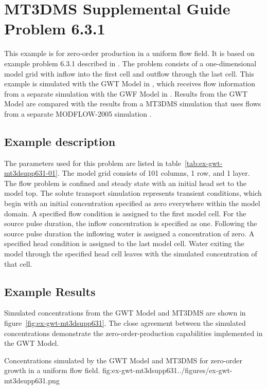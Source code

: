\section{MT3DMS Supplemental Guide Problem 6.3.1}

This example is for zero-order production in a uniform flow field.  It is based on example problem 6.3.1 described in \cite{zheng2010mt3dmsv5.3}.  The problem consists of a one-dimensional model grid with inflow into the first cell and outflow through the last cell.  This example is simulated with the GWT Model in \mf, which receives flow information from a separate simulation with the GWF Model in \mf.  Results from the GWT Model are compared with the results from a MT3DMS simulation \citep{zheng1990mt3d} that uses flows from a separate MODFLOW-2005 simulation \citep{modflow2005}.  

\subsection{Example description}

The parameters used for this problem are listed in table~\ref{tab:ex-gwt-mt3dsupp631-01}.  The model grid consists of 101 columns, 1 row, and 1 layer.  The flow problem is confined and steady state with an initial head set to the model top.  The solute transport simulation represents transient conditions, which begin with an initial concentration specified as zero everywhere within the model domain.  A specified flow condition is assigned to the first model cell.  For the source pulse duration, the inflow concentration is specified as one.  Following the source pulse duration the inflowing water is assigned a concentration of zero.  A specified head condition is assigned to the last model cell.  Water exiting the model through the specified head cell leaves with the simulated concentration of that cell.



\subsection{Example Results}

Simulated concentrations from the \mf GWT Model and MT3DMS are shown in figure~\ref{fig:ex-gwt-mt3dsupp631}.  The close agreement between the simulated concentrations demonstrate the zero-order-production capabilities implemented in the GWT Model.

\begin{StandardFigure}{
                                     Concentrations simulated by the \mf GWT Model and MT3DMS for zero-order growth in a uniform flow field.
                                     }{fig:ex-gwt-mt3dsupp631}{../figures/ex-gwt-mt3dsupp631.png}
\end{StandardFigure}                                 

